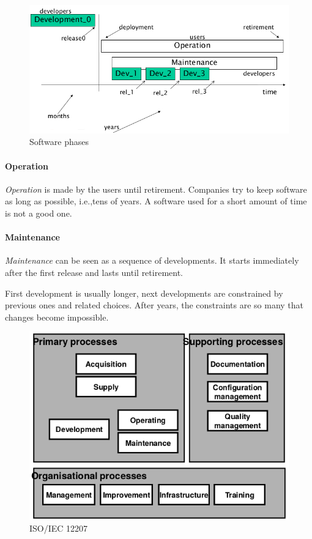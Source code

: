 \begin{figure}[hbtp]
\centering
\includegraphics[scale=0.4]{images/software_phases.jpg}
\caption{Software phases}
\end{figure}

\paragraph{Operation}
\emph{Operation} is made by the users until retirement. Companies try to keep software as long as possible, i.e.,\@ tens of years. A software used for a short amount of time is not a good one. 

\paragraph{Maintenance}
\emph{Maintenance} can be seen as a sequence of developments. It starts immediately after the first release and lasts until retirement.

First development is usually longer, next developments are constrained by previous ones and related choices. After years, the constraints are so many that changes become impossible.

\begin{figure}[hbtp]
\centering
\includegraphics[scale=0.4]{images/iso_iec_12207.png}
\caption{ISO/IEC 12207}
\label{img:iso_iec_12207}
\end{figure}

